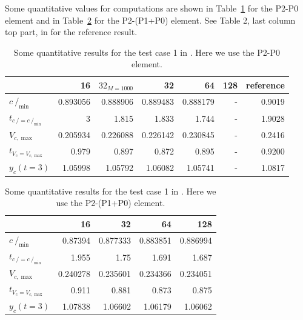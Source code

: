 \documentclass[a4paper,12pt,onecolumn]{article}
\newcommand{\strikec}{\mbox{$c\!\!\!\!\:/$}}
\begin{document}
Some quantitative values for computations are shown in
Table~\ref{tab:2d_benchmark1_P0} for the P2-P0 element and
in Table~\ref{tab:2d_benchmark1_P1P0} for the P2-(P1+P0) element. See Table 2,
last column top part, in \cite{fluidfbp} for the reference result.

\begin{table}
\center
\begin{tabular}{lrrrrrr}
\hline
& 16 & $32_{M=1000}$ & 32 & 64 & 128 & reference \\
\hline
$\strikec_{\min}$ & 0.893056 & 0.888906 & 0.889483 & 0.888179 & - & 0.9019 \\
$t_{\strikec = \strikec_{\min}}$ & 3 & 1.815 & 1.833 & 1.744 & - & 1.9028 \\
$V_{c,\max}$ & 0.205934 & 0.226088 & 0.226142 & 0.230845 & - & 0.2416 \\
$t_{V_c = V_{c,\max}}$ & 0.979 & 0.897 & 0.872 & 0.895 & - & 0.9200 \\
$y_c(t=3)$ & 1.05998 & 1.05792 & 1.06082 & 1.05741 & - & 1.0817 \\
\hline
\end{tabular}
\caption{Some quantitative results for the test case 1 in
\cite{HysingTKPBGT09}. Here we use the P2-P0 element.}
\label{tab:2d_benchmark1_P0}
\end{table}

\begin{table}
\center
\begin{tabular}{lrrrr}
\hline
& 16 & 32 & 64 & 128 \\
\hline
$\strikec_{\min}$ & 0.87394 & 0.877333 & 0.883851 & 0.886994\\
$t_{\strikec = \strikec_{\min}}$ & 1.955 & 1.75 & 1.691 & 1.687\\
$V_{c,\max}$ & 0.240278 & 0.235601 & 0.234366 & 0.234051\\
$t_{V_c = V_{c,\max}}$ & 0.911 & 0.881 & 0.873 & 0.875\\
$y_c(t=3)$ & 1.07838 & 1.06602 & 1.06179 & 1.06062\\
\hline
\end{tabular}
\caption{Some quantitative results for the test case 1 in
\cite{HysingTKPBGT09}. Here we use the P2-(P1+P0) element.}
\label{tab:2d_benchmark1_P1P0}
\end{table}
\end{document}
